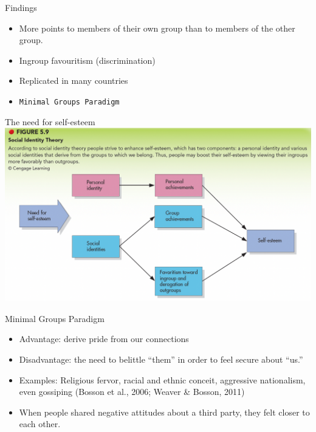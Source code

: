 \documentclass[
  ignorenonframetext,
  aspectratio=169,
]{beamer}
\providecommand{\tightlist}{%
  \setlength{\itemsep}{0pt}\setlength{\parskip}{0pt}}\usepackage{longtable,booktabs,array}
\begin{document}
\begin{frame}[fragile]{Findings}
\label{findings}
\begin{itemize}[<+->]
\tightlist
\item
  More points to members of their own group than to members of the other
  group.
\item
  Ingroup favouritism (discrimination)
\item
  Replicated in many countries
\item
  \texttt{Minimal\ Groups\ Paradigm}
\end{itemize}
\end{frame}

\begin{frame}{The need for self-esteem}
\label{the-need-for-self-esteem}
\includegraphics{selfesteem.png}
\end{frame}

\begin{frame}{Minimal Groups Paradigm}
\label{minimal-groups-paradigm}
\begin{itemize}[<+->]
\tightlist
\item
  Advantage: derive pride from our connections
\item
  Disadvantage: the need to belittle ``them'' in order to feel secure
  about ``us.''
\item
  Examples: Religious fervor, racial and ethnic conceit, aggressive
  nationalism, even gossiping (Bosson et al., 2006; Weaver \& Bosson,
  2011)
\item
  When people shared negative attitudes about a third party, they felt
  closer to each other.
\end{itemize}
\end{frame}
\end{document}
